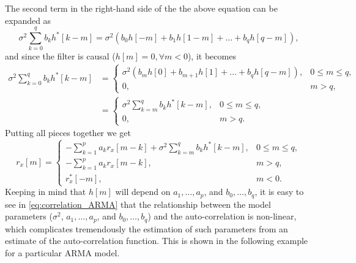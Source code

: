 The second term in the right-hand side of the the above equation can be expanded as
\begin{equation*}
\sigma^2 \sum_{k = 0}^{q} b_k  h^{\ast}[k-m] = \sigma^2  \left(b_0 h[-m] + b_1 h[1-m] + \ldots + b_q h[q-m]\right),
\end{equation*}
and since the filter is causal ($h[m] = 0, \forall m<0$), it becomes
\begin{align*}
\sigma^2  \sum_{k = 0}^{q} b_k  h^{\ast}[k-m] &= \begin{cases}
\sigma^2  \left(b_m h[0] + b_{m+1} h[1] + \ldots + b_q h[q-m]\right), & 0 \leq  m \leq q, \\ 
0, & m > q,
\end{cases} \nonumber \\
&= \begin{cases}
\displaystyle \sigma^2  \sum_{k = m}^{q} b_k  h^{\ast}[k-m], & 0 \leq  m \leq q, \\ 
0, & m > q.
\end{cases}
\end{align*}
Putting all pieces together we get
\begin{equation}
\label{eq:correlation_ARMA}
r_{x}[m] = \begin{cases}
\displaystyle - \sum_{k = 1}^{p} a_k r_{x}[m-k] + \sigma^2  \sum_{k = m}^{q} b_k  h^{\ast}[k-m], & 0 \leq  m \leq q, \\ 
\displaystyle  - \sum_{k = 1}^{p} a_k r_{x}[m-k], & m > q, \\
r_{x}^{\ast}[-m], & m < 0.
\end{cases}
\end{equation}
Keeping in mind that $h[m]$ will depend on $a_1, \ldots, a_p$, and $b_0, \ldots, b_q$, it is easy to see in \eqref{eq:correlation_ARMA} that the relationship between the model parameters ($\sigma^2$, $a_1, \ldots, a_p$, and $b_0, \ldots, b_q$) and the auto-correlation is non-linear, which complicates tremendously the estimation of such parameters from an estimate of the auto-correlation function. This is shown in the following example for a particular ARMA model.


